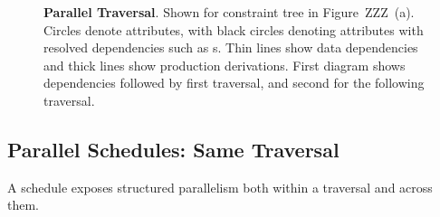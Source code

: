 \begin{figure}
\caption{\textbf{Parallel Traversal}. Shown for constraint tree  in Figure~ZZZ~(a). Circles denote attributes, with black circles denoting attributes with resolved dependencies such as s. Thin lines show data dependencies and thick lines show production derivations. First diagram shows dependencies followed by first traversal, and second for the following traversal.}
\label{fig:depsparallel}
\end{figure}


\subsection{Parallel Schedules: Same Traversal}
A schedule exposes structured parallelism both within a traversal and across them. 

